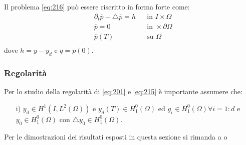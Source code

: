 Il problema \ref{eq:216} può essere riscritto in forma forte come:
\begin{equation}
\begin{aligned}
& {\partial_{t}}\overline{p} -\bigtriangleup\overline{p} = h & & \text{in }I{\times}\Omega \\
& \overline{p}=0 & & \text{in }{\times}\partial\Omega \\
& \overline{p}(T) & & \text{su }\Omega \\
\label{eq:217}
\end{aligned}
\end{equation}
dove $ h= \overline{y} - y_d$ e $\overline{q}=\overline{p}(0)$.

\subsubsection{Regolarità}
Per lo studio della regolarità di \ref{eq:201} e \ref{eq:215} è importante assumere che:
\begin{itemize}
\item[i)] $y_d \in H^1(I,{L^{2}(\Omega)})$ e $y_d(T) \in {H^{0}_{1}(\Omega)}$ ed $g_i \in {H^{0}_{1}(\Omega)} {\forall}i=1:d$ e $y_0 \in {H^{0}_{1}(\Omega)}$ con ${\bigtriangleup}y_0 \in {H^{0}_{1}(\Omega)}$.
\end{itemize} 
Per le dimostrazioni dei risultati esposti in questa sezione si rimanda a \cite{MAIN} o \cite{MV11}
